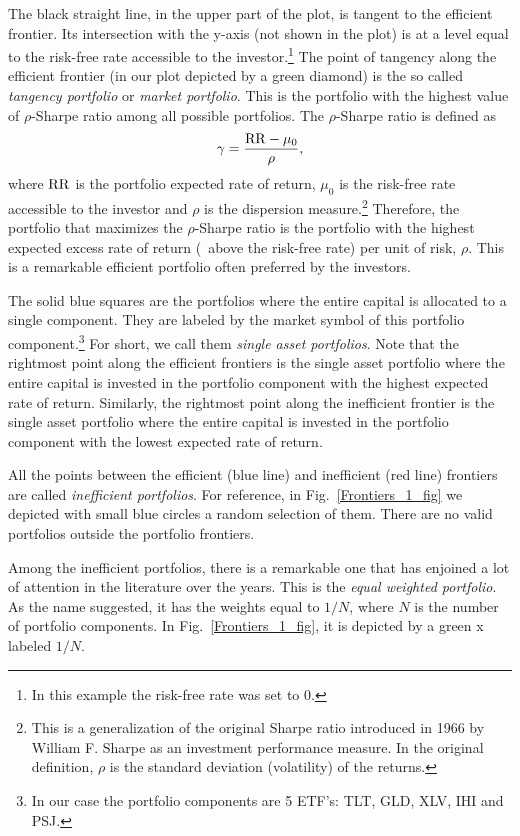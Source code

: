 The black straight line, in the upper part of the plot, is tangent to the efficient frontier.
Its intersection with the y-axis (not shown in the plot) is at a level equal to the risk-free rate accessible to the investor.\footnote{In this example the risk-free rate was set to $0$.} The point of tangency along the efficient frontier (in our plot depicted by a green diamond)
is the so called {\it tangency portfolio} or {\it market portfolio}. This is the portfolio with the highest value of $\rho$-Sharpe ratio among all possible portfolios.
The $\rho$-Sharpe ratio is defined as
\begin{equation}
    \Sharpe = \frac{\RR-\mu_0}{\rho}, \label{ggg}
\end{equation}
where ${\rm RR}$ is the portfolio expected rate of return, $\mu_0$ is the risk-free rate accessible to the investor and
$\rho$ is the dispersion measure.\footnote{This is a generalization of the original Sharpe ratio introduced in 1966 by
William F. Sharpe \cite{Sharpe1966} as an  investment performance measure. In the original definition, $\rho$ is the
standard deviation (volatility) of the returns.}
Therefore, the portfolio that maximizes the $\rho$-Sharpe ratio is the portfolio with the highest expected excess rate of return (\ie\ above the risk-free rate) per unit of risk, $\rho$. This is a remarkable efficient portfolio often preferred by the investors.

The solid blue squares are the portfolios where the entire capital is allocated to a single component.
They are labeled by the market symbol of this portfolio component.\footnote{In our case the portfolio components are
5 ETF's: TLT, GLD, XLV, IHI and PSJ.} For short, we call them {\it single asset portfolios}.
Note that the rightmost point along the efficient frontiers is the single asset portfolio where the entire capital is invested in the portfolio component with the highest expected rate of return.
Similarly, the rightmost point along the inefficient frontier is the single asset portfolio where the entire
capital is invested in the portfolio component with the lowest expected rate of return.

All the points between the efficient (blue line) and inefficient (red line) frontiers are called {\it inefficient portfolios}.
For reference, in Fig.~\ref{Frontiers_1_fig} we depicted with small blue circles a random selection of them.
There are no valid portfolios outside the portfolio frontiers.

Among the inefficient portfolios, there is a remarkable one that has enjoined a lot of attention in the literature over the years.
This is the {\it equal weighted portfolio}.
As the name suggested, it has the weights equal to $1/N$, where $N$ is the number of portfolio components.
In Fig.~\ref{Frontiers_1_fig}, it is depicted by a green x labeled $1/N$.

